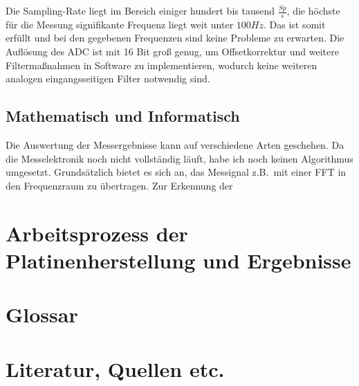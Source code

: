 \documentclass[12pt,a4paper,notitlepage]{article}
\begin{document}
Die \gls{Sampling}-Rate liegt im Bereich einiger hundert bis tausend $\frac{Sp}{s}$, die höchste für die Messung signifikante Frequenz liegt weit unter $100Hz$. Das  ist somit erfüllt und bei den gegebenen Frequenzen sind keine Probleme zu erwarten.
Die Auflösung des \gls{ADC} ist mit 16 Bit groß genug, um \gls{Offsetkorrektur} und weitere Filtermaßnahmen in Software zu implementieren, wodurch keine weiteren analogen eingangsseitigen Filter notwendig sind.

\subsection{Mathematisch und Informatisch}
Die Auswertung der Messergebnisse kann auf verschiedene Arten geschehen. Da die Messelektronik noch nicht vollständig läuft, habe ich noch keinen Algorithmus umgesetzt.
Grundsätzlich bietet es sich an, das Messignal z.B.\ mit einer \gls{FFT} in den Frequenzraum zu übertragen. Zur Erkennung der 
\cite{WP2,WP11,WP12,WP13}
\section{Arbeitsprozess der Platinenherstellung und Ergebnisse}
\appendix
\section{Glossar}
\glsaddall
\printglossaries
\section{Literatur, Quellen etc.}
\nocite{*}

\renewcommand{\refname}{}

\end{document}
